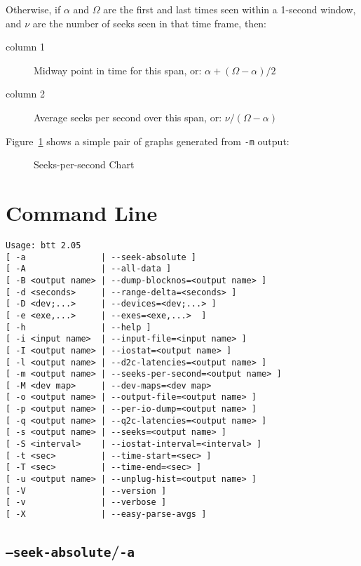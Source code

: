 \documentclass{article}
\begin{document}
  Otherwise, if $\alpha$ and $\Omega$ are the first and last times
  seen within a 1-second window, and $\nu$ are the number of seeks seen
  in that time frame, then:

  \begin{description}
    \item[column 1] Midway point in time for this span, or: \hfill$\alpha +
    {{(\Omega - \alpha)} / 2}$

    \item[column 2] Average seeks per second over this span, or: \hfill$\nu  /
    {(\Omega - \alpha)}$
  \end{description}

  Figure~\ref{fig:sps} shows a simple pair of graphs generated from
  \texttt{-m} output:

  \begin{figure}[h!]
  \leavevmode\centering
  \caption{\label{fig:sps}Seeks-per-second Chart}
  \end{figure}
  \FloatBarrier

\newpage\section{\label{sec:cmd-line}Command Line}

\begin{verbatim}
Usage: btt 2.05
[ -a               | --seek-absolute ]
[ -A               | --all-data ]
[ -B <output name> | --dump-blocknos=<output name> ]
[ -d <seconds>     | --range-delta=<seconds> ]
[ -D <dev;...>     | --devices=<dev;...> ]
[ -e <exe,...>     | --exes=<exe,...>  ]
[ -h               | --help ]
[ -i <input name>  | --input-file=<input name> ]
[ -I <output name> | --iostat=<output name> ]
[ -l <output name> | --d2c-latencies=<output name> ]
[ -m <output name> | --seeks-per-second=<output name> ]
[ -M <dev map>     | --dev-maps=<dev map>
[ -o <output name> | --output-file=<output name> ]
[ -p <output name> | --per-io-dump=<output name> ]
[ -q <output name> | --q2c-latencies=<output name> ]
[ -s <output name> | --seeks=<output name> ]
[ -S <interval>    | --iostat-interval=<interval> ]
[ -t <sec>         | --time-start=<sec> ]
[ -T <sec>         | --time-end=<sec> ]
[ -u <output name> | --unplug-hist=<output name> ]
[ -V               | --version ]
[ -v               | --verbose ]
[ -X               | --easy-parse-avgs ]
\end{verbatim}

\subsection{\label{sec:o-a}\texttt{--seek-absolute}/\texttt{-a}}
\end{document}
